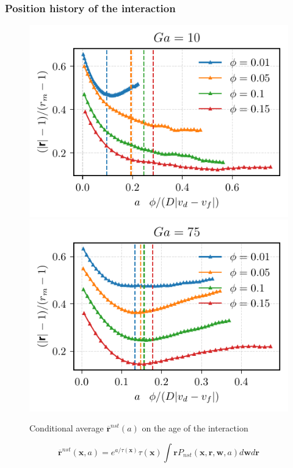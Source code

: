 \documentclass{sintefbeamer}
\newcommand{\nstavg}[1]{\overline{#1}^{nst}}
\begin{document}
\begin{frame}
  \frametitle{Position history of the interaction}
    \begin{figure}
        \includegraphics[height=0.23\textwidth]{image/HOMOGENEOUS/fDrop/r_a_Ga_10.pdf}
        \includegraphics[height=0.23\textwidth]{image/HOMOGENEOUS/fDrop/r_a_Ga_75.pdf}
        \caption{ Conditional average $\nstavg{\textbf{r}}(a)$ on the age of the interaction} 
    \end{figure}
  \begin{equation*}
     \nstavg{\textbf{r}}(\textbf{x},a)
    = e^{a/\tau(\textbf{x})}\tau(\textbf{x})\int \textbf{r} P_{nst}(\textbf{x},\textbf{r},\textbf{w},a) d\textbf{w}d\textbf{r}
  \end{equation*}

\end{frame}
\end{document}
